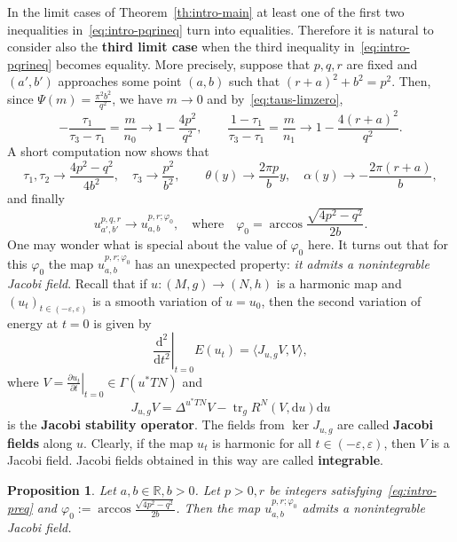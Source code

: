 \documentclass{amsart}
\let\epsilon\varepsilon
\let\phi\varphi
\renewcommand{\d}{\mathrm{d}}
\DeclareMathOperator{\tr}{tr}
\theoremstyle{plain}
\newtheorem{proposition}{Proposition}[section]
\theoremstyle{definition}
\theoremstyle{remark}
\begin{document}
In the limit cases of Theorem~\ref{th:intro-main} at least one of the first two
inequalities in~\eqref{eq:intro-pqrineq} turn into equalities. Therefore it is
natural to consider also the \textbf{third limit case} when the third inequality
in~\eqref{eq:intro-pqrineq} becomes equality. More precisely, suppose that
\(p,q,r\) are fixed and \((a',b')\) approaches some point \((a,b)\) such that
\((r+a)^2+b^2=p^2\). Then, since \(\Psi(m)=\frac{\pi^2 b^2}{q^2}\), we have
\(m\to 0\) and by~\eqref{eq:taus-limzero},
\[
-\frac{\tau_1}{\tau_3-\tau_1}=\frac{m}{n_0}\to 1-\frac{4p^2}{q^2},\qquad
\frac{1-\tau_1}{\tau_3-\tau_1}=\frac{m}{n_1}\to 1-\frac{4(r+a)^2}{q^2}.
\]
A short computation now shows that
\[
\tau_1,\tau_2\to\frac{4p^2-q^2}{4b^2},\quad
\tau_3\to\frac{p^2}{b^2},\qquad
\theta(y)\to\frac{2\pi p}b y,\quad
\alpha(y)\to -\frac{2\pi(r+a)}b,
\]
and finally
\begin{equation}\label{eq:lim3-lim}
u_{a',b'}^{p,q,r}\to u_{a,b}^{p,r;\phi_0},\quad\text{where}\quad
\phi_0=\arccos\frac{\sqrt{4p^2-q^2}}{2b}.
\end{equation}
One may wonder what is special about the value of \(\phi_0\) here. It turns out
that for this \(\phi_0\) the map \(u_{a,b}^{p,r;\phi_0}\) has an unexpected
property: \emph{it admits a nonintegrable Jacobi field}. Recall that if
\(u\colon (M,g)\to (N,h)\) is a harmonic map and \((u_t)_{t\in
(-\epsilon,\epsilon)}\) is a smooth variation of \(u=u_0\), then the second
variation of energy at \(t=0\) is given by
\[
\left.\frac{\d^2}{\d t^2}\right|_{t=0}E(u_t)=\langle J_{u,g}V,V\rangle,
\]
where \(V=\left.\frac{\partial u_t}{\partial t}\right|_{t=0}\in \Gamma(u^*TN)\)
and
\[
J_{u,g}V=\Delta^{u^*TN}V-\tr_g R^N(V,\d u)\d u
\]
is the \textbf{Jacobi stability operator}. The fields from \(\ker J_{u,g}\) are
called \textbf{Jacobi fields} along \(u\). Clearly, if the map \(u_t\) is
harmonic for all \(t\in (-\epsilon,\epsilon)\), then \(V\) is a Jacobi field.
Jacobi fields obtained in this way are called \textbf{integrable}.

\begin{proposition}
Let \(a,b\in\mathbb R,b>0\). Let \(p>0,r\) be integers
satisfying~\eqref{eq:intro-preq} and
\(\phi_0:=\arccos\frac{\sqrt{4p^2-q^2}}{2b}\). Then the map
\(u_{a,b}^{p,r;\phi_0}\) admits a nonintegrable Jacobi field.
\end{proposition}
\end{document}
